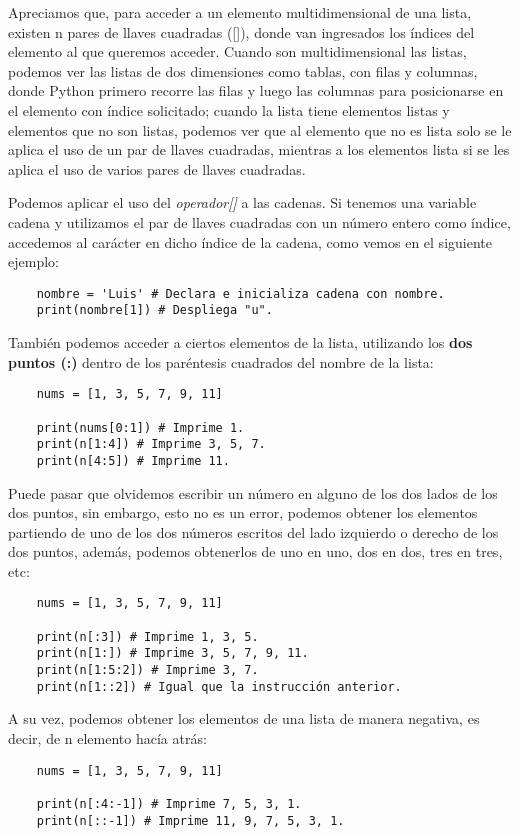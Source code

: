 Apreciamos que, para acceder a un elemento multidimensional de una lista, existen n pares de llaves cuadradas ([]), donde van ingresados los índices del elemento al que queremos acceder. Cuando son multidimensional las listas, podemos ver las listas de dos dimensiones como tablas, con filas y columnas, donde Python primero recorre las filas y luego las columnas para posicionarse en el elemento con índice solicitado; cuando la lista tiene elementos listas y elementos que no son listas, podemos ver que al elemento que no es lista solo se le aplica el uso de un par de llaves cuadradas, mientras a los elementos lista si se les aplica el uso de varios pares de llaves cuadradas.

Podemos aplicar el uso del \textit{operador[]} a las cadenas. Si tenemos una variable cadena y utilizamos el par de llaves cuadradas con un número entero como índice, accedemos al carácter en dicho índice de la cadena, como vemos en el siguiente ejemplo:
\begin{lstlisting}
    nombre = 'Luis' # Declara e inicializa cadena con nombre.
    print(nombre[1]) # Despliega "u".
\end{lstlisting}

También podemos acceder a ciertos elementos de la lista, utilizando los \textbf{dos puntos (:)} dentro de los paréntesis cuadrados del nombre de la lista:
\begin{lstlisting}
	nums = [1, 3, 5, 7, 9, 11]
	
	print(nums[0:1]) # Imprime 1.
	print(n[1:4]) # Imprime 3, 5, 7.
	print(n[4:5]) # Imprime 11.
\end{lstlisting}

Puede pasar que olvidemos escribir un número en alguno de los dos lados de los dos puntos, sin embargo, esto no es un error, podemos obtener los elementos partiendo de uno de los dos números escritos del lado izquierdo o derecho de los dos puntos, además, podemos obtenerlos de uno en uno, dos en dos, tres en tres, etc:
\begin{lstlisting}
	nums = [1, 3, 5, 7, 9, 11]
	
	print(n[:3]) # Imprime 1, 3, 5.
	print(n[1:]) # Imprime 3, 5, 7, 9, 11.
	print(n[1:5:2]) # Imprime 3, 7.
	print(n[1::2]) # Igual que la instrucción anterior.
\end{lstlisting}

A su vez, podemos obtener los elementos de una lista de manera negativa, es decir, de n elemento hacía atrás:
\begin{lstlisting}
	nums = [1, 3, 5, 7, 9, 11]
	
	print(n[:4:-1]) # Imprime 7, 5, 3, 1.
	print(n[::-1]) # Imprime 11, 9, 7, 5, 3, 1.
\end{lstlisting}


